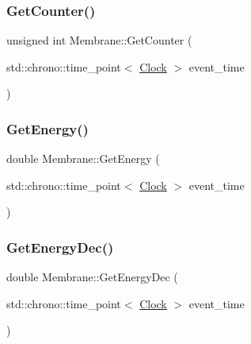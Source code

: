 \mbox{\label{classMembrane_a85f8b2633ff32f79b6fbb466ce690858}} 
\subsubsection{\texorpdfstring{Get\+Counter()}{GetCounter()}}
{\footnotesize\ttfamily unsigned int Membrane\+::\+Get\+Counter (\begin{DoxyParamCaption}\item[{std\+::chrono\+::time\+\_\+point$<$ \mbox{\hyperlink{universe_8h_a0ef8d951d1ca5ab3cfaf7ab4c7a6fd80}{Clock}} $>$}]{event\+\_\+time }\end{DoxyParamCaption})\hspace{0.3cm}{\ttfamily [inline]}}

\mbox{\label{classMembrane_a50d39c596daa7af8da7dd7215d3a32ba}} 
\subsubsection{\texorpdfstring{Get\+Energy()}{GetEnergy()}}
{\footnotesize\ttfamily double Membrane\+::\+Get\+Energy (\begin{DoxyParamCaption}\item[{std\+::chrono\+::time\+\_\+point$<$ \mbox{\hyperlink{universe_8h_a0ef8d951d1ca5ab3cfaf7ab4c7a6fd80}{Clock}} $>$}]{event\+\_\+time }\end{DoxyParamCaption})\hspace{0.3cm}{\ttfamily [inline]}}

\mbox{\label{classMembrane_a874068c028004d4dde7ec41d999872eb}} 
\subsubsection{\texorpdfstring{Get\+Energy\+Dec()}{GetEnergyDec()}}
{\footnotesize\ttfamily double Membrane\+::\+Get\+Energy\+Dec (\begin{DoxyParamCaption}\item[{std\+::chrono\+::time\+\_\+point$<$ \mbox{\hyperlink{universe_8h_a0ef8d951d1ca5ab3cfaf7ab4c7a6fd80}{Clock}} $>$}]{event\+\_\+time }\end{DoxyParamCaption})\hspace{0.3cm}{\ttfamily [inline]}}


